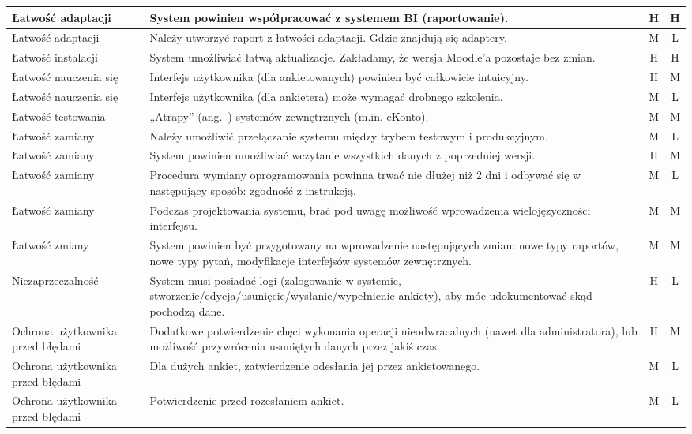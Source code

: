 \begin{center}
\begin{longtable}{ | p{4cm} | p{9cm} | c | c | }
%
Łatwość adaptacji & System powinien współpracować z systemem BI (raportowanie). & H & H \\ \hline
Łatwość adaptacji & Należy utworzyć raport z łatwości adaptacji. Gdzie znajdują się adaptery. & M & L \\ \hline
%
Łatwość instalacji & System umożliwiać łatwą aktualizacje. Zakładamy, że wersja Moodle'a pozostaje bez zmian. & H & H \\ \hline
%
Łatwość nauczenia się & Interfejs użytkownika (dla ankietowanych) powinien być całkowicie intuicyjny. & H & M \\ \hline
Łatwość nauczenia się & Interfejs użytkownika (dla ankietera) może wymagać drobnego szkolenia. & M & L \\ \hline
%
Łatwość testowania & „Atrapy” (ang.~{mock}) systemów zewnętrznych (m.in. eKonto). & M & M \\ \hline
Łatwość zamiany & Należy umożliwić przełączanie systemu między trybem testowym i produkcyjnym. & M & L \\ \hline
%
Łatwość zamiany & System powinien umożliwiać wczytanie wszystkich danych z poprzedniej wersji. & H & M \\ \hline
Łatwość zamiany & Procedura wymiany oprogramowania powinna trwać nie dłużej niż 2 dni i odbywać się w następujący sposób: zgodność z instrukcją. & M & L \\ \hline
Łatwość zamiany & Podczas projektowania systemu, brać pod uwagę możliwość wprowadzenia wielojęzyczności interfejsu. & M & M \\ \hline
%
Łatwość zmiany & System powinien być przygotowany na wprowadzenie następujących zmian: nowe typy raportów, nowe typy pytań, modyfikacje interfejsów systemów zewnętrznych. & M & M \\ \hline
%
Niezaprzeczalność & System musi posiadać logi (zalogowanie w systemie, stworzenie\slash edycja\slash usunięcie\slash wysłanie\slash wypełnienie ankiety), aby móc udokumentować skąd pochodzą dane. & H & L \\ \hline
%
Ochrona użytkownika przed błędami & Dodatkowe potwierdzenie chęci wykonania operacji nieodwracalnych (nawet dla administratora), lub możliwość przywrócenia usuniętych danych przez jakiś czas. & H & M \\ \hline
Ochrona użytkownika przed błędami & Dla dużych ankiet, zatwierdzenie odesłania jej przez ankietowanego. & M & L \\ \hline
Ochrona użytkownika przed błędami & Potwierdzenie przed rozesłaniem ankiet. & M & L \\ \hline

\end{longtable}
\end{center}
